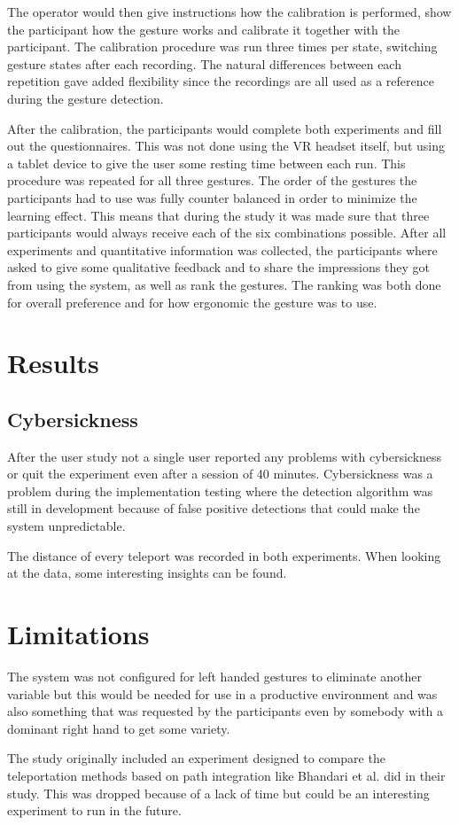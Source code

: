 The operator would then give instructions how the calibration is performed, show the participant how the gesture works and calibrate it together with the participant. The calibration procedure was run three times per state, switching gesture states after each recording. The natural differences between each repetition gave added flexibility since the recordings are all used as a reference during the gesture detection.

After the calibration, the participants would complete both experiments and fill out the questionnaires. This was not done using the VR headset itself, but using a tablet device to give the user some resting time between each run. This procedure was repeated for all three gestures. 
The order of the gestures the participants had to use was fully counter balanced in order to minimize the learning effect. This means that during the study it was made sure that three participants would always receive each of the six combinations possible. 
After all experiments and quantitative information was collected, the participants where asked to give some qualitative feedback and to share the impressions they got from using the system, as well as rank the gestures. The ranking was both done for overall preference and for how ergonomic the gesture was to use.   


\section{Results}

\subsection{Cybersickness}
After the user study not a single user reported any problems with cybersickness or quit the experiment even after a session of 40 minutes. Cybersickness was a problem during the implementation testing where the detection algorithm was still in development because of false positive detections that could make the system unpredictable.


The distance of every teleport was recorded in both experiments. When looking at the data, some interesting insights can be found. %

\section{Limitations}
The system was not configured for left handed gestures to eliminate another variable but this would be needed for use in a productive environment and was also something that was requested by the participants even by somebody with a dominant right hand to get some variety. 

The study originally included an experiment designed to compare the teleportation methods based on path integration like Bhandari et al. \cite{Bhandari} did in their study. This was dropped because of a lack of time but could be an interesting experiment to run in the future.
